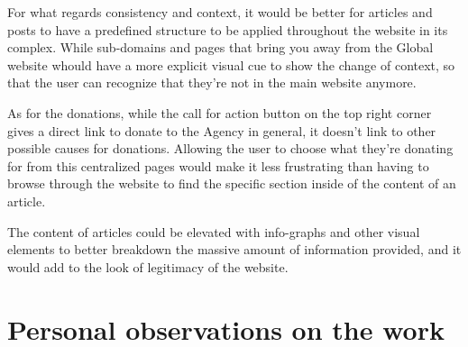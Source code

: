 For what regards consistency and context, it would be better for articles and posts to have a predefined structure to be applied throughout the website in its complex. While sub-domains and pages that bring you away from the Global website whould have a more explicit visual cue to show the change of context, so that the user can recognize that they're not in the main website anymore.

As for the donations, while the call for action button on the top right corner gives a direct link to donate to the Agency in general, it doesn't link to other possible causes for donations. Allowing the user to choose what they're donating for from this centralized pages would make it less frustrating than having to browse through the website to find the specific section inside of the content of an article.

The content of articles could be elevated with info-graphs and other visual elements to better breakdown the massive amount of information provided, and it would add to the look of legitimacy of the website.

\section{Personal observations on the work}
